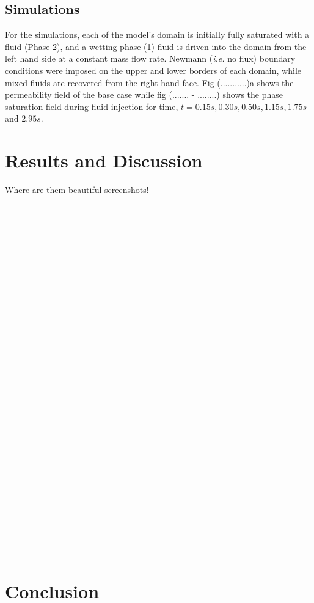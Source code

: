 \documentclass[preprint,12pt]{elsarticle}
\begin{document}
\subsection{Simulations}\label{subsection:simulations}
For the simulations, each of the model's domain is initially fully saturated with a fluid (Phase 2), and a wetting phase (1) fluid is driven into the domain from the left hand side at a constant mass flow rate. Newmann ({\it i.e.} no flux) boundary conditions were imposed on the upper and lower borders of each domain, while mixed fluids are recovered from the right-hand face. Fig (...........)a shows the permeability field of the base case while fig (....... - ........) shows the phase saturation field during fluid injection for time, $t = 0.15s, 0.30s, 0.50s, 1.15s, 1.75s$ and $2.95s$.

\section{Results and Discussion}\label{section:results_discussion}

Where are them beautiful screenshots!\\
\\
\\
\\
\\
\\
\\
\\
\\
\\
\\
\\
\\
\\
\\
\\
\\
\\
\\
\\
\\
\\
\\
\\
\\
\\
\\
\\
\\
\\
\\

\section{Conclusion}\label{section:conclusion}
\end{document}
